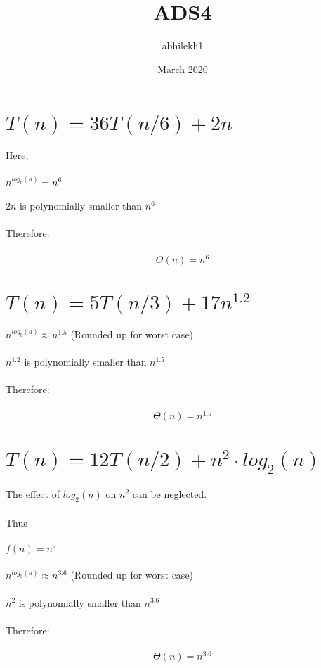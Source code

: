 \documentclass{article}
\title{ADS4}
\author{abhilekh1 }
\date{March 2020}
\begin{document}
\maketitle

\section{$T(n) = 36T(n/6) + 2n$}
Here,\\\\
$n^{log_{b}(a)} = n^6$\\\\
$2n$ is polynomially smaller than $n^6$\\\\
Therefore:\\\\
$$\Theta(n) = n^6$$

\section{$T(n) = 5T(n/3) + 17n^{1.2}$}

$n^{log_{b}(a)} \approx n^{1.5}$ (Rounded up for worst case)\\\\ 
$n^{1.2}$ is polynomially smaller than $n^{1.5}$\\\\
Therefore:\\\\
$$\Theta(n) = n^{1.5}$$


\section{$T(n) = 12T(n/2) + n^2 \cdot log_{2}(n)$}
The effect of $log_{2}(n)$ on $n^2$ can be neglected.\\\\
Thus\\\\
$f(n) = n^2$\\\\
$n^{log_{b}(a)} \approx n^3.6$ (Rounded up for worst case)\\\\
$n^{2}$ is polynomially smaller than $n^{3.6}$\\\\
Therefore:\\\\
$$\Theta(n) = n^{3.6}$$\\\\
\end{document}
